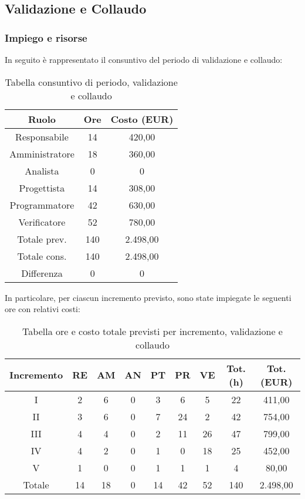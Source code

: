 \subsection{Validazione e Collaudo}
\subsubsection{Impiego e risorse}
In seguito è rappresentato il consuntivo del periodo di validazione e collaudo:
\begin{table}[h]
	\caption{Tabella consuntivo di periodo, validazione e collaudo}  
	\begin{center}
		\begin{tabular}{ |c|c|c|  }
			\hline
			Ruolo 		& Ore & Costo (EUR)\\
			\hline\hline
			Responsabile	& 14 & 420,00\\
			Amministratore	& 18 & 360,00\\
			Analista		& 0 & 0\\
			Progettista		& 14 & 308,00\\
			Programmatore	& 42 & 630,00\\
			Verificatore	& 52 & 780,00\\
			\hline\hline
			Totale prev.	& 140 & 2.498,00 \\
			Totale cons.	& 140 & 2.498,00 \\
			Differenza		& 0 & 0 \\
			\hline
		\end{tabular}
	\end{center}
\end{table}

\newpage
\noindent In particolare, per ciascun incremento previsto, sono state impiegate le seguenti ore con relativi costi:

\begin{table}[h]
	\caption{Tabella ore e costo totale previsti per incremento, validazione e collaudo}
	\begin{center}
		\begin{tabular}{ |c|c|c|c|c|c|c|c|c|  }
			\hline
			Incremento 		& RE 	& AM 	& AN 	& PT 	& PR 	& VE 	& Tot. (h) & Tot. (EUR) \\
			\hline\hline
			I		& 2 		& 6			& 0 	& 3 	& 6 		& 5 		& 22	& 411,00\\
			II		& 3 		& 6 		& 0 	& 7		& 24 		& 2 		& 42	& 754,00\\
			III		& 4 		& 4 		& 0 	& 2		& 11 		& 26 		& 47	& 799,00\\
			IV		& 4 		& 2 		& 0 	& 1 	& 0 		& 18 		& 25 	& 452,00\\
			V		& 1 		& 0 		& 0 	& 1		& 1 		& 1	 		& 4		& 80,00\\
			\hline\hline
			Totale		& 14		& 18		& 0 	& 14	 	& 42 	& 52 	& 140 	& 2.498,00\\
			\hline
		\end{tabular}
	\end{center}
\end{table}

